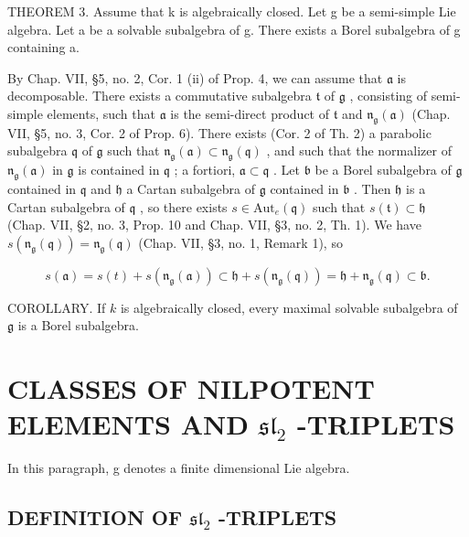 THEOREM 3. Assume that k is algebraically closed. Let g be a semi-simple Lie algebra. Let a be a solvable subalgebra of g. There exists a Borel subalgebra of g containing a.

By Chap. VII, §5, no. 2, Cor. 1 (ii) of Prop. 4, we can assume that \(\mathfrak{a}\) is decomposable. There exists a commutative subalgebra \(\mathfrak{t}\) of \(\mathfrak{g}\) , consisting of semi-simple elements, such that \(\mathfrak{a}\) is the semi-direct product of \(\mathfrak{t}\) and \(\mathfrak{n}_{\mathfrak{g}}(\mathfrak{a})\) (Chap. VII, §5, no. 3, Cor. 2 of Prop. 6). There exists (Cor. 2 of Th. 2) a parabolic subalgebra \(\mathfrak{q}\) of \(\mathfrak{g}\) such that \(\mathfrak{n}_{\mathfrak{g}}(\mathfrak{a}) \subset \mathfrak{n}_{\mathfrak{g}}(\mathfrak{q})\) , and such that the normalizer of \(\mathfrak{n}_{\mathfrak{g}}(\mathfrak{a})\) in \(\mathfrak{g}\) is contained in \(\mathfrak{q}\) ; a fortiori, \(\mathfrak{a} \subset \mathfrak{q}\) . Let \(\mathfrak{b}\) be a Borel subalgebra of \(\mathfrak{g}\) contained in \(\mathfrak{q}\) and \(\mathfrak{h}\) a Cartan subalgebra of \(\mathfrak{g}\) contained in \(\mathfrak{b}\) . Then \(\mathfrak{h}\) is a Cartan subalgebra of \(\mathfrak{q}\) , so there exists \(s \in \mathrm{Aut}_e(\mathfrak{q})\) such that \(s(\mathfrak{t}) \subset \mathfrak{h}\) (Chap. VII, §2, no. 3, Prop. 10 and Chap. VII, §3, no. 2, Th. 1). We have \(s(\mathfrak{n}_{\mathfrak{g}}(\mathfrak{q})) = \mathfrak{n}_{\mathfrak{g}}(\mathfrak{q})\) (Chap. VII, §3, no. 1, Remark 1), so

\[
s (\mathfrak {a}) = s (t) + s \left(\mathfrak {n} _ {\mathfrak {g}} (\mathfrak {a})\right) \subset \mathfrak {h} + s \left(\mathfrak {n} _ {\mathfrak {g}} (\mathfrak {q})\right) = \mathfrak {h} + \mathfrak {n} _ {\mathfrak {g}} (\mathfrak {q}) \subset \mathfrak {b}.
\]

COROLLARY. If \(k\) is algebraically closed, every maximal solvable subalgebra of \(\mathfrak{g}\) is a Borel subalgebra.

\section{\texorpdfstring{CLASSES OF NILPOTENT ELEMENTS AND \(\mathfrak{sl}_2\) -TRIPLETS}{CLASSES OF NILPOTENT ELEMENTS AND \textbackslash mathfrak\{sl\}\_2 -TRIPLETS}}

In this paragraph, g denotes a finite dimensional Lie algebra.

\subsection{\texorpdfstring{DEFINITION OF \(\mathfrak{sl}_2\) -TRIPLETS}{DEFINITION OF \textbackslash mathfrak\{sl\}\_2 -TRIPLETS}}

